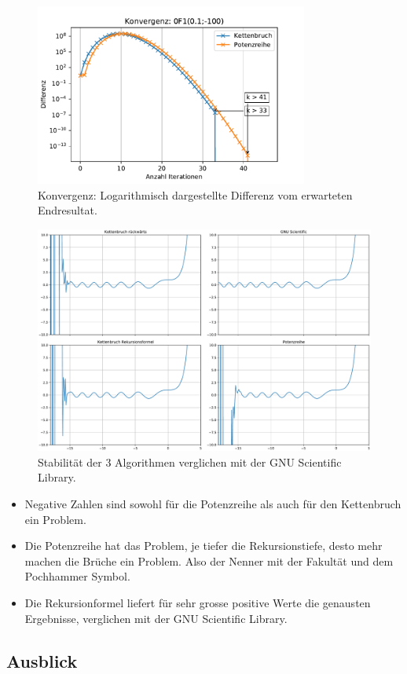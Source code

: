 \begin{figure}
    \centering
    \includegraphics[width=0.8\textwidth]{papers/0f1/images/konvergenzNegativ.pdf}
    \caption{Konvergenz: Logarithmisch dargestellte Differenz vom erwarteten Endresultat.
    \label{0f1:ausblick:plot:konvergenz:negativ}}
\end{figure}

\begin{figure}
    \centering
    \includegraphics[width=1\textwidth]{papers/0f1/images/stabilitaet.pdf}
    \caption{Stabilität der 3 Algorithmen verglichen mit der GNU Scientific Library.
    \label{0f1:ausblick:plot:airy:stabilitaet}}
\end{figure}

\begin{itemize}
    \item Negative Zahlen sind sowohl für die Potenzreihe als auch für den Kettenbruch ein Problem.
    \item Die Potenzreihe hat das Problem, je tiefer die Rekursionstiefe, desto mehr machen die Brüche ein Problem. Also der Nenner mit der Fakultät und dem Pochhammer Symbol.
    \item Die Rekursionformel liefert für sehr grosse positive Werte die genausten Ergebnisse, verglichen mit der GNU Scientific Library.
\end{itemize}


\subsection{Ausblick
\label{0f1:subsection:ausblick}}



